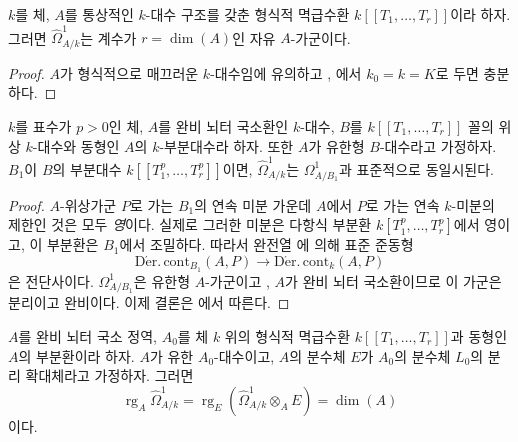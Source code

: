 \begin{corollary}[21.9.3]
\label{0.21.9.3-ko}
$k$를 체, $A$를 통상적인 $k$-대수 구조를 갖춘 형식적 멱급수환
$k[[T_1,\ldots,T_r]]$이라 하자. 그러면 $\widehat\Omega^1_{A/k}$는
계수가 $r=\dim(A)$인 자유 $A$-가군이다.
\end{corollary}

\begin{proof}
$A$가 형식적으로 매끄러운 $k$-대수임에 유의하고
, 에서 $k_0=k=K$로 두면 충분하다.
\end{proof}

\begin{lemma}[21.9.4]
\label{0.21.9.4-ko}
$k$를 표수가 $p>0$인 체, $A$를 완비 뇌터 국소환인 $k$-대수,
$B$를 $k[[T_1,\ldots,T_r]]$ 꼴의 위상 $k$-대수와 동형인 $A$의
$k$-부분대수라 하자. 또한 $A$가 유한형 $B$-대수라고 가정하자.
$B_1$이 $B$의 부분대수 $k[[T_1^p,\ldots,T_r^p]]$이면,
$\widehat\Omega^1_{A/k}$는 $\Omega^1_{A/B_1}$과 표준적으로 동일시된다.
\end{lemma}

\begin{proof}
$A$-위상가군 $P$로 가는 $B_1$의 연속 미분 가운데 $A$에서 $P$로
가는 연속 $k$-미분의 제한인 것은 모두 \emph{영}이다. 실제로 그러한
미분은 다항식 부분환 $k[T_1^p,\ldots,T_r^p]$에서 영이고, 이 부분환은
$B_1$에서 조밀하다. 따라서 완전열 에 의해 표준
준동형
\[
  \operatorname{D\acute{e}r.\,cont}_{B_1}(A,P)
  \longrightarrow \operatorname{D\acute{e}r.\,cont}_k(A,P)
\]
은 전단사이다. $\Omega^1_{A/B_1}$은 유한형 $A$-가군이고
, $A$가 완비 뇌터 국소환이므로 이 가군은 분리이고
완비이다. 이제 결론은 에서 따른다.
\end{proof}

\begin{proposition}[21.9.5]
\label{0.21.9.5-ko}
$A$를 완비 뇌터 국소 정역, $A_0$를 체 $k$ 위의 형식적 멱급수환
$k[[T_1,\ldots,T_r]]$과 동형인 $A$의 부분환이라 하자. $A$가 유한
$A_0$-대수이고, $A$의 분수체 $E$가 $A_0$의 분수체 $L_0$의 분리
확대체라고 가정하자. 그러면
\begin{equation}
\tag{21.9.5.1}
\label{0.21.9.5.1-ko}
  \operatorname{rg}_A\widehat\Omega^1_{A/k}
  =\operatorname{rg}_E(\widehat\Omega^1_{A/k}\otimes_AE)=\dim(A)
\end{equation}
이다.
\end{proposition}


